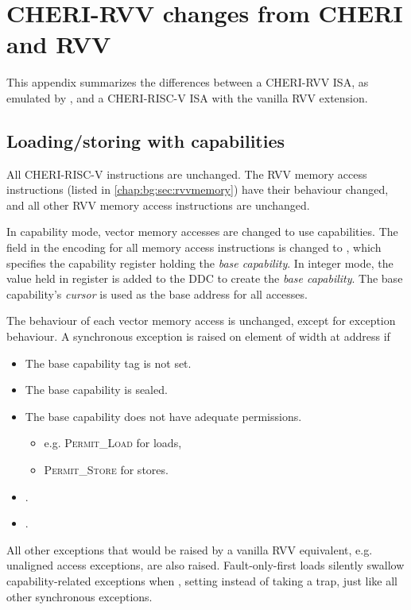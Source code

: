 \chapter{CHERI-RVV changes from CHERI and RVV}

This appendix summarizes the differences between a CHERI-RVV ISA, as emulated by , and a CHERI-RISC-V ISA with the vanilla RVV extension.

\section{Loading/storing with capabilities}
All CHERI-RISC-V instructions are unchanged.
The RVV memory access instructions (listed in \cref{chap:bg:sec:rvvmemory}) have their behaviour changed, and all other RVV memory access instructions are unchanged.

In capability mode, vector memory accesses are changed to use capabilities.
The  field in the encoding for all memory access instructions is changed to , which specifies the capability register holding the \emph{base capability}.
In integer mode, the value held in register  is added to the DDC to create the \emph{base capability}.
The base capability's \emph{cursor} is used as the base address for all accesses.

The behaviour of each vector memory access is unchanged, except for exception behaviour.
A synchronous exception is raised on element  of width  at address  if
\begin{itemize}
    \item The base capability tag is not set.
    \item The base capability is sealed.
    \item The base capability does not have adequate permissions.
    \begin{itemize}
        \item e.g. \textsc{Permit\_Load} for loads,
        \item[] \textsc{Permit\_Store} for stores.
    \end{itemize}
    \item {}.
    \item {}.
\end{itemize}
All other exceptions that would be raised by a vanilla RVV equivalent, e.g. unaligned access exceptions, are also raised.
Fault-only-first loads silently swallow capability-related exceptions when , setting  instead of taking a trap, just like all other synchronous exceptions.

